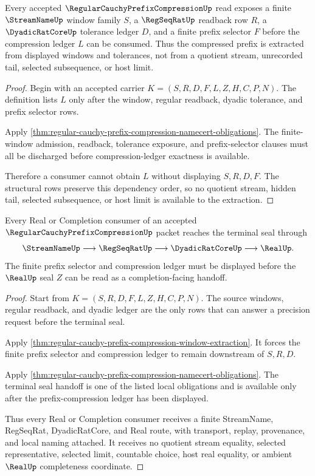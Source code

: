 \begin{theorem}
\label{thm:regular-cauchy-prefix-compression-window-extraction}
Every accepted $\RegularCauchyPrefixCompressionUp$ read exposes a finite $\StreamNameUp$ window family $S$, a $\RegSeqRatUp$ readback row $R$, a $\DyadicRatCoreUp$ tolerance ledger $D$, and a finite prefix selector $F$ before the compression ledger $L$ can be consumed. Thus the compressed prefix is extracted from displayed windows and tolerances, not from a quotient stream, unrecorded tail, selected subsequence, or host limit.
\end{theorem}
\begin{proof}
Begin with an accepted carrier $K=(S,R,D,F,L,Z,H,C,P,N)$. The definition lists $L$ only after the window, regular readback, dyadic tolerance, and prefix selector rows.

Apply \autoref{thm:regular-cauchy-prefix-compression-namecert-obligations}. The finite-window admission, readback, tolerance exposure, and prefix-selector clauses must all be discharged before compression-ledger exactness is available.

Therefore a consumer cannot obtain $L$ without displaying $S,R,D,F$. The structural rows preserve this dependency order, so no quotient stream, hidden tail, selected subsequence, or host limit is available to the extraction.
\end{proof}

\begin{theorem}
\label{thm:regular-cauchy-prefix-compression-real-handoff}
Every Real or Completion consumer of an accepted $\RegularCauchyPrefixCompressionUp$ packet reaches the terminal seal through
$$
\StreamNameUp\longrightarrow \RegSeqRatUp\longrightarrow \DyadicRatCoreUp\longrightarrow \RealUp .
$$
The finite prefix selector and compression ledger must be displayed before the $\RealUp$ seal $Z$ can be read as a completion-facing handoff.
\end{theorem}
\begin{proof}
Start from $K=(S,R,D,F,L,Z,H,C,P,N)$. The source windows, regular readback, and dyadic ledger are the only rows that can answer a precision request before the terminal seal.

Apply \autoref{thm:regular-cauchy-prefix-compression-window-extraction}. It forces the finite prefix selector and compression ledger to remain downstream of $S,R,D$.

Apply \autoref{thm:regular-cauchy-prefix-compression-namecert-obligations}. The terminal seal handoff is one of the listed local obligations and is available only after the prefix-compression ledger has been displayed.

Thus every Real or Completion consumer receives a finite StreamName, RegSeqRat, DyadicRatCore, and Real route, with transport, replay, provenance, and local naming attached. It receives no quotient stream equality, selected representative, selected limit, countable choice, host real equality, or ambient $\RealUp$ completeness coordinate.
\end{proof}

